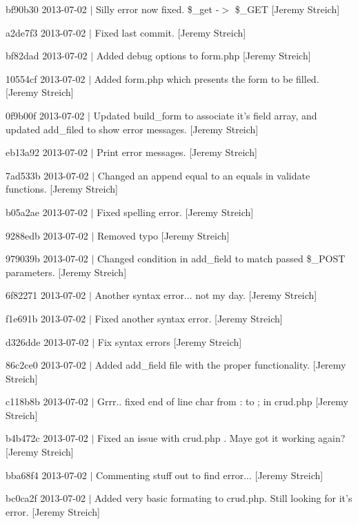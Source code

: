 \begin{DoxyItemize}
\item bf90b30 2013-\/07-\/02 $|$ Silly error now fixed. \$\-\_\-get -\/$>$ \$\-\_\-\-G\-E\-T \mbox{[}Jeremy Streich\mbox{]}
\item a2de7f3 2013-\/07-\/02 $|$ Fixed last commit. \mbox{[}Jeremy Streich\mbox{]}
\item bf82dad 2013-\/07-\/02 $|$ Added debug options to form.\-php \mbox{[}Jeremy Streich\mbox{]}
\item 10554cf 2013-\/07-\/02 $|$ Added form.\-php which presents the form to be filled. \mbox{[}Jeremy Streich\mbox{]}
\item 0f9b00f 2013-\/07-\/02 $|$ Updated build\-\_\-form to associate it's field array, and updated add\-\_\-filed to show error messages. \mbox{[}Jeremy Streich\mbox{]}
\item eb13a92 2013-\/07-\/02 $|$ Print error messages. \mbox{[}Jeremy Streich\mbox{]}
\item 7ad533b 2013-\/07-\/02 $|$ Changed an append equal to an equals in validate functions. \mbox{[}Jeremy Streich\mbox{]}
\item b05a2ae 2013-\/07-\/02 $|$ Fixed spelling error. \mbox{[}Jeremy Streich\mbox{]}
\item 9288edb 2013-\/07-\/02 $|$ Removed typo \mbox{[}Jeremy Streich\mbox{]}
\item 979039b 2013-\/07-\/02 $|$ Changed condition in add\-\_\-field to match passed \$\-\_\-\-P\-O\-S\-T parameters. \mbox{[}Jeremy Streich\mbox{]}
\item 6f82271 2013-\/07-\/02 $|$ Another syntax error... not my day. \mbox{[}Jeremy Streich\mbox{]}
\item f1e691b 2013-\/07-\/02 $|$ Fixed another syntax error. \mbox{[}Jeremy Streich\mbox{]}
\item d326dde 2013-\/07-\/02 $|$ Fix syntax errors \mbox{[}Jeremy Streich\mbox{]}
\item 86c2ce0 2013-\/07-\/02 $|$ Added add\-\_\-field file with the proper functionality. \mbox{[}Jeremy Streich\mbox{]}
\item c118b8b 2013-\/07-\/02 $|$ Grrr.. fixed end of line char from \-: to ; in crud.\-php \mbox{[}Jeremy Streich\mbox{]}
\item b4b472c 2013-\/07-\/02 $|$ Fixed an issue with crud.\-php . Maye got it working again? \mbox{[}Jeremy Streich\mbox{]}
\item bba68f4 2013-\/07-\/02 $|$ Commenting stuff out to find error... \mbox{[}Jeremy Streich\mbox{]}
\item bc0ca2f 2013-\/07-\/02 $|$ Added very basic formating to crud.\-php. Still looking for it's error. \mbox{[}Jeremy Streich\mbox{]}

\end{DoxyItemize}
